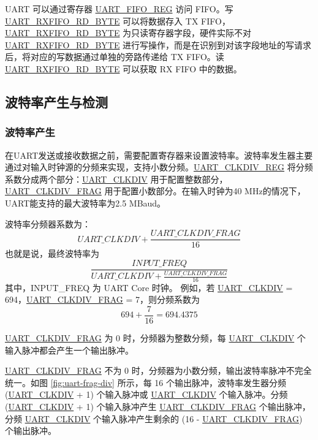 \documentclass[main\_\_CN.tex]{subfiles}
\begin{document}
UART 可以通过寄存器 \hyperref[regdesc:UARTFIFOREG]{UART\_FIFO\_REG} 访问 FIFO。写 \hyperref[fielddesc:UARTRXFIFORDBYTE]{UART\_RXFIFO\_RD\_BYTE} 可以将数据存入 TX FIFO，\hyperref[fielddesc:UARTRXFIFORDBYTE]{UART\_RXFIFO\_RD\_BYTE} 为只读寄存器字段，硬件实际不对 \hyperref[fielddesc:UARTRXFIFORDBYTE]{UART\_RXFIFO\_RD\_BYTE} 进行写操作，而是在识别到对该字段地址的写请求后，将对应的写数据通过单独的旁路传递给 TX FIFO。读 \hyperref[fielddesc:UARTRXFIFORDBYTE]{UART\_RXFIFO\_RD\_BYTE} 可以获取 RX FIFO 中的数据。

\clearpage
\subsection{波特率产生与检测}

\subsubsection{波特率产生}

在UART发送或接收数据之前，需要配置寄存器来设置波特率。波特率发生器主要通过对输入时钟源的分频来实现，支持小数分频。\hyperref[regdesc:UARTCLKDIVREG]{UART\_CLKDIV\_REG} 将分频系数分成两个部分：\hyperref[fielddesc:UARTCLKDIV]{UART\_CLKDIV} 用于配置整数部分，\hyperref[fielddesc:UARTCLKDIVFRAG]{UART\_CLKDIV\_FRAG} 用于配置小数部分。在输入时钟为40 MHz的情况下，UART能支持的最大波特率为2.5 MBaud。

波特率分频器系数为：
\[
    \hyperref[fielddesc:UARTCLKDIV]{UART\_CLKDIV} + \frac{\hyperref[fielddesc:UARTCLKDIVFRAG]{UART\_CLKDIV\_FRAG}}{16}
\]
也就是说，最终波特率为
\[
    \frac{INPUT\_FREQ}{\hyperref[fielddesc:UARTCLKDIV]{UART\_CLKDIV} + \frac{\hyperref[fielddesc:UARTCLKDIVFRAG]{UART\_CLKDIV\_FRAG}}{16}}
\]
其中，INPUT\_FREQ 为 UART Core 时钟。
例如，若 \hyperref[fielddesc:UARTCLKDIV]{UART\_CLKDIV} = 694，\hyperref[fielddesc:UARTCLKDIVFRAG]{UART\_CLKDIV\_FRAG} = 7，则分频系数为
\[
    694 + \frac{7}{16} = 694.4375
\]


\hyperref[fielddesc:UARTCLKDIVFRAG]{UART\_CLKDIV\_FRAG} 为 0 时，分频器为整数分频，每 \hyperref[fielddesc:UARTCLKDIV]{UART\_CLKDIV} 个输入脉冲都会产生一个输出脉冲。

\hyperref[fielddesc:UARTCLKDIVFRAG]{UART\_CLKDIV\_FRAG} 不为 0 时，分频器为小数分频，输出波特率脉冲不完全统一。如图 \ref{fig:uart-frag-div} 所示，每 16 个输出脉冲，波特率发生器分频 (\hyperref[fielddesc:UARTCLKDIV]{UART\_CLKDIV} + 1) 个输入脉冲或 \hyperref[fielddesc:UARTCLKDIV]{UART\_CLKDIV} 个输入脉冲。分频 (\hyperref[fielddesc:UARTCLKDIV]{UART\_CLKDIV} + 1) 个输入脉冲产生 \hyperref[fielddesc:UARTCLKDIVFRAG]{UART\_CLKDIV\_FRAG} 个输出脉冲，分频 \hyperref[fielddesc:UARTCLKDIV]{UART\_CLKDIV} 个输入脉冲产生剩余的 (16 - \hyperref[fielddesc:UARTCLKDIVFRAG]{UART\_CLKDIV\_FRAG}) 个输出脉冲。
\end{document}
